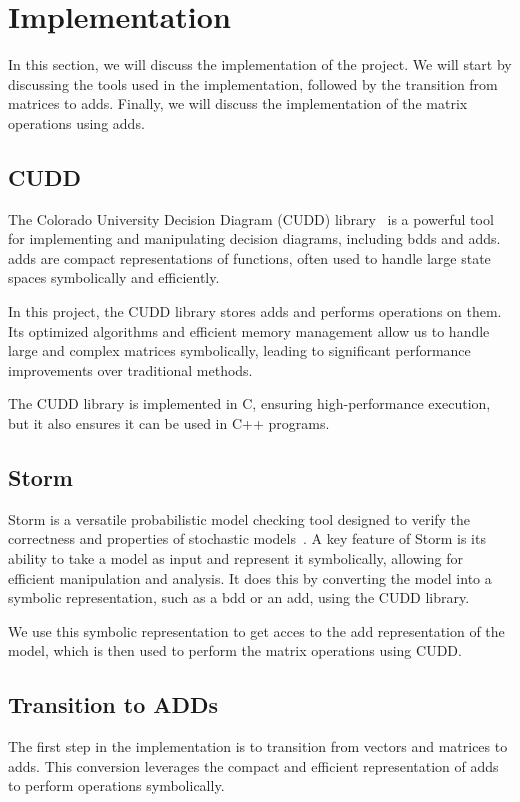 \section{Implementation}\label{sec:implementation}
In this section, we will discuss the implementation of the project.
We will start by discussing the tools used in the implementation, followed by the transition from matrices to \glspl{add}.
Finally, we will discuss the implementation of the matrix operations using \glspl{add}.

\subsection{CUDD}\label{subsec:cudd}
The Colorado University Decision Diagram (CUDD) library~\cite{somenzi1997cudd} is a powerful tool for implementing and manipulating decision diagrams, including \glspl{bdd} and \glspl{add}. \glspl{add} are compact representations of functions, often used to handle large state spaces symbolically and efficiently.

In this project, the CUDD library stores \glspl{add} and performs operations on them.
Its optimized algorithms and efficient memory management allow us to handle large and complex matrices symbolically, leading to significant performance improvements over traditional methods.

The CUDD library is implemented in C, ensuring high-performance execution, but it also ensures it can be used in C++ programs.

\subsection{Storm}\label{subsec:storm}
Storm is a versatile probabilistic model checking tool designed to verify the correctness and properties of stochastic models~\cite{hensel2021probabilistic}.
A key feature of Storm is its ability to take a model as input and represent it symbolically, allowing for efficient manipulation and analysis.
It does this by converting the model into a symbolic representation, such as a \gls{bdd} or an \gls{add}, using the CUDD library.

We use this symbolic representation to get acces to the \gls{add} representation of the model, which is then used to perform the matrix operations using CUDD\@.

\subsection{Transition to ADDs}\label{subsec:transition-to-adds}
The first step in the implementation is to transition from vectors and matrices to \glspl{add}.
This conversion leverages the compact and efficient representation of \glspl{add} to perform operations symbolically.

